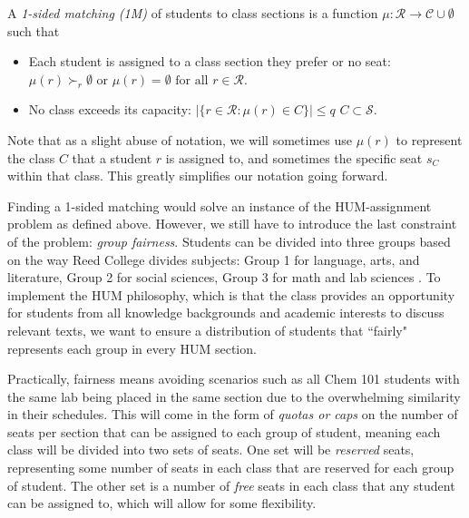 \begin{definition} \label{def:1m}
  A \emph{1-sided matching (1M)} of students to class sections is a function $\mu :
  \mathcal{R} \rightarrow \mathcal{C} \cup \emptyset $ such that
  \begin{itemize}
    \item
          Each student is assigned to a class section they prefer or no
          seat: \\ $\mu(r) \succ_r \emptyset\text{ or } \mu(r) = \emptyset
          \text{ for all }r \in \mathcal{R}$.
    \item
          No class exceeds its capacity:
          $|\{r \in \mathcal{R} : \mu(r) \in C\}| \leq q$  $C
          \subset \mathcal{S}$.
  \end{itemize}
\end{definition}

Note that as a slight abuse of notation, we will sometimes use $\mu(r)$ to
represent the class $C$ that a student $r$ is assigned to, and sometimes the
specific seat $s_C$ within
that class. This greatly simplifies our notation going forward. 


Finding a 1-sided matching would solve an instance of the HUM-assignment problem
as defined above. However, we still have to introduce the last constraint of the
problem: \emph{group fairness}. Students can be divided into three groups based
on the way Reed College divides
subjects: Group 1 for language, arts, and literature, Group 2 for
social sciences, Group 3 for math and lab sciences \cite{group-reqs}. To implement the HUM
philosophy, which is that the class provides an opportunity for students from all
knowledge backgrounds and academic interests to discuss relevant texts, we want
to ensure a distribution of students that ``fairly" represents each group in every
HUM section. 

Practically, fairness means avoiding scenarios such as all Chem 101 students
with the same lab being placed
in the same section due to the overwhelming similarity in their schedules. This
will come in the form of \textit{quotas or caps} on the number of seats per section that
can be assigned to each group of student, meaning each class will be divided 
into two sets of seats. One set will be \textit{reserved} seats, representing
some number of seats in each class that are reserved for each group of student.
The other set is a number of \textit{free} seats in each class that any student can be
assigned to, which will allow for some flexibility. 

